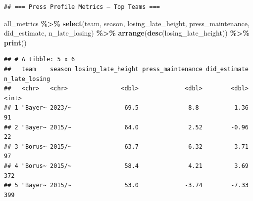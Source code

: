 \documentclass[
]{article}
\newenvironment{Shaded}{\begin{snugshade}}{\end{snugshade}}
\newcommand{\FunctionTok}[1]{\textcolor[rgb]{0.13,0.29,0.53}{\textbf{#1}}}
\newcommand{\NormalTok}[1]{#1}
\newcommand{\SpecialCharTok}[1]{\textcolor[rgb]{0.81,0.36,0.00}{\textbf{#1}}}
\begin{document}
\begin{verbatim}
## === Press Profile Metrics — Top Teams ===
\end{verbatim}

\begin{Shaded}
\begin{Highlighting}[]
\NormalTok{all\_metrics }\SpecialCharTok{\%\textgreater{}\%}
  \FunctionTok{select}\NormalTok{(team, season, losing\_late\_height, press\_maintenance,}
\NormalTok{         did\_estimate, n\_late\_losing) }\SpecialCharTok{\%\textgreater{}\%}
  \FunctionTok{arrange}\NormalTok{(}\FunctionTok{desc}\NormalTok{(losing\_late\_height)) }\SpecialCharTok{\%\textgreater{}\%}
  \FunctionTok{print}\NormalTok{()}
\end{Highlighting}
\end{Shaded}

\begin{verbatim}
## # A tibble: 5 x 6
##   team    season losing_late_height press_maintenance did_estimate n_late_losing
##   <chr>   <chr>               <dbl>             <dbl>        <dbl>         <int>
## 1 "Bayer~ 2023/~               69.5              8.8          1.36            91
## 2 "Bayer~ 2015/~               64.0              2.52        -0.96            22
## 3 "Borus~ 2015/~               63.7              6.32         3.71            97
## 4 "Borus~ 2015/~               58.4              4.21         3.69           372
## 5 "Bayer~ 2015/~               53.0             -3.74        -7.33           399
\end{verbatim}
\end{document}
